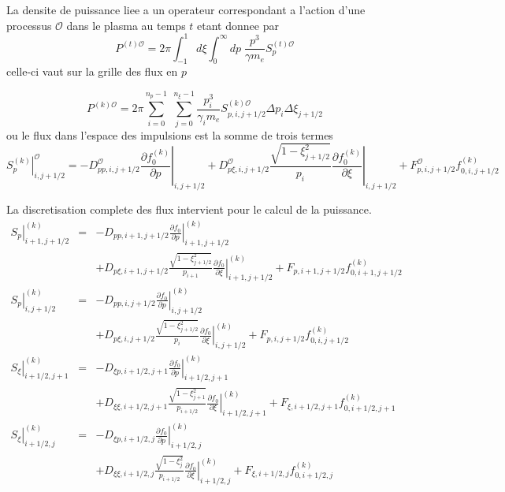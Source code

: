 La densite de puissance liee a un operateur correspondant a l'action
d'une processus $\mathcal{O}$ dans le plasma au temps $t$ etant
donnee par \[
P^{(t)\mathcal{O}}=2\pi\int_{-1}^{1}d\xi\int_{0}^{\infty}dp\;\frac{p^{3}}{\gamma m_{e}}S_{p}^{(t)\mathcal{O}}\]
 celle-ci vaut sur la grille des flux en $p$

\[
P^{(k)\mathcal{O}}=2\pi\sum_{i=0}^{n_{p}-1}\;\sum_{j=0}^{n_{\xi}-1}\frac{p_{i}^{3}}{\gamma_{i}m_{e}}S_{p,i,j+1/2}^{(k)\mathcal{O}}\Delta p_{i}\Delta\xi_{j+1/2}\]
 ou le flux dans l'espace des impulsions est la somme de trois termes
\[
\left.S_{p}^{(k)}\right|_{i,j+1/2}^{\mathcal{O}}=-D_{pp,i,j+1/2}^{\mathcal{O}}\left.\frac{\partial f_{0}^{(k)}}{\partial p}\right|_{i,j+1/2}+D_{p\xi,i,j+1/2}^{\mathcal{O}}\frac{\sqrt{1-\xi_{j+1/2}^{2}}}{p_{i}}\left.\frac{\partial f_{0}^{(k)}}{\partial\xi}\right|_{i,j+1/2}+F_{p,i,j+1/2}^{\mathcal{O}}f_{0,i,j+1/2}^{(k)}\]


La discretisation complete des flux intervient pour le calcul de la
puissance. \begin{eqnarray*}
\left.S_{p}\right|_{i+1,j+1/2}^{(k)} & = & -D_{pp,i+1,j+1/2}\left.\frac{\partial f_{0}}{\partial p}\right|_{i+1,j+1/2}^{(k)}\\
 &  & +D_{p\xi,i+1,j+1/2}\frac{\sqrt{1-\xi_{j+1/2}^{2}}}{p_{i+1}}\left.\frac{\partial f_{0}}{\partial\xi}\right|_{i+1,j+1/2}^{(k)}+F_{p,i+1,j+1/2}f_{0,i+1,j+1/2}^{(k)}\\
\left.S_{p}\right|_{i,j+1/2}^{(k)} & = & -D_{pp,i,j+1/2}\left.\frac{\partial f_{0}}{\partial p}\right|_{i,j+1/2}^{(k)}\\
 &  & +D_{p\xi,i,j+1/2}\frac{\sqrt{1-\xi_{j+1/2}^{2}}}{p_{i}}\left.\frac{\partial f_{0}}{\partial\xi}\right|_{i,j+1/2}^{(k)}+F_{p,i,j+1/2}f_{0,i,j+1/2}^{(k)}\\
\left.S_{\xi}\right|_{i+1/2,j+1}^{(k)} & = & -D_{\xi p,i+1/2,j+1}\left.\frac{\partial f_{0}}{\partial p}\right|_{i+1/2,j+1}^{(k)}\\
 &  & +D_{\xi\xi,i+1/2,j+1}\frac{\sqrt{1-\xi_{j+1}^{2}}}{p_{i+1/2}}\left.\frac{\partial f_{0}}{\partial\xi}\right|_{i+1/2,j+1}^{(k)}+F_{\xi,i+1/2,j+1}f_{0,i+1/2,j+1}^{(k)}\\
\left.S_{\xi}\right|_{i+1/2,j}^{(k)} & = & -D_{\xi p,i+1/2,j}\left.\frac{\partial f_{0}}{\partial p}\right|_{i+1/2,j}^{(k)}\\
 &  & +D_{\xi\xi,i+1/2,j}\frac{\sqrt{1-\xi_{j}^{2}}}{p_{i+1/2}}\left.\frac{\partial f_{0}}{\partial\xi}\right|_{i+1/2,j}^{(k)}+F_{\xi,i+1/2,j}f_{0,i+1/2,j}^{(k)}\end{eqnarray*}


